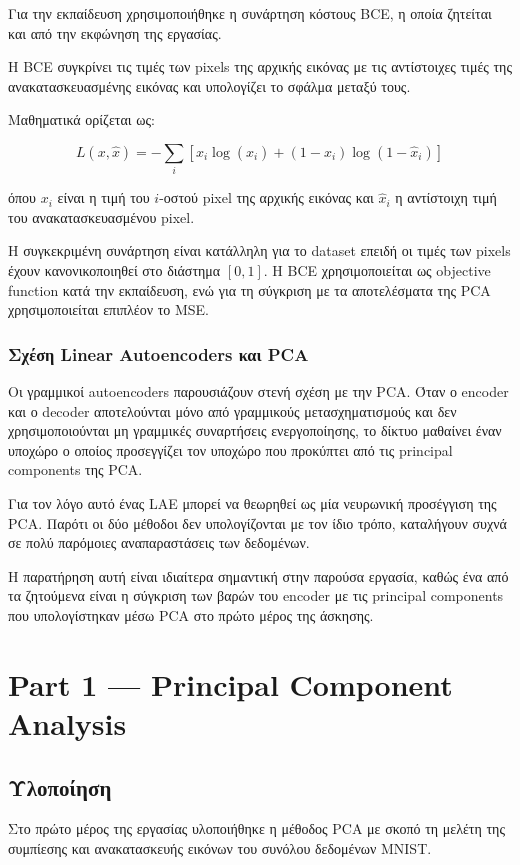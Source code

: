 \documentclass[12pt]{article}
\begin{document}
Για την εκπαίδευση χρησιμοποιήθηκε η συνάρτηση κόστους BCE, η οποία ζητείται και από την εκφώνηση της εργασίας.

Η BCE συγκρίνει τις τιμές των pixels της αρχικής εικόνας με τις αντίστοιχες τιμές της ανακατασκευασμένης εικόνας και υπολογίζει το σφάλμα μεταξύ τους.

Μαθηματικά ορίζεται ως:

\[
L(x,\hat{x})
=
-\sum_i
\left[
x_i \log(\hat{x}_i)
+
(1-x_i)\log(1-\hat{x}_i)
\right]
\]

όπου \(x_i\) είναι η τιμή του \(i\)-οστού pixel της αρχικής εικόνας και \(\hat{x}_i\) η αντίστοιχη τιμή του ανακατασκευασμένου pixel.

Η συγκεκριμένη συνάρτηση είναι κατάλληλη για το dataset επειδή οι τιμές των pixels έχουν κανονικοποιηθεί στο διάστημα \([0,1]\). Η BCE χρησιμοποιείται 
ως objective function κατά την εκπαίδευση, ενώ για τη σύγκριση με τα αποτελέσματα της PCA χρησιμοποιείται επιπλέον το MSE.


\subsubsection{Σχέση Linear Autoencoders και PCA}

Οι γραμμικοί autoencoders παρουσιάζουν στενή σχέση με την PCA. Όταν ο encoder και ο decoder αποτελούνται μόνο από γραμμικούς μετασχηματισμούς και δεν 
χρησιμοποιούνται μη γραμμικές συναρτήσεις ενεργοποίησης, το δίκτυο μαθαίνει έναν υποχώρο ο οποίος προσεγγίζει τον υποχώρο που προκύπτει από τις 
principal components της PCA.

Για τον λόγο αυτό ένας LAE μπορεί να θεωρηθεί ως μία νευρωνική προσέγγιση της PCA. Παρότι οι δύο μέθοδοι δεν υπολογίζονται με τον ίδιο τρόπο, καταλήγουν 
συχνά σε πολύ παρόμοιες αναπαραστάσεις των δεδομένων.

Η παρατήρηση αυτή είναι ιδιαίτερα σημαντική στην παρούσα εργασία, καθώς ένα από τα ζητούμενα είναι η σύγκριση των βαρών του encoder με τις 
principal components που υπολογίστηκαν μέσω PCA στο πρώτο μέρος της άσκησης.






\section{Part 1 — Principal Component Analysis}

\subsection{Υλοποίηση}
Στο πρώτο μέρος της εργασίας υλοποιήθηκε η μέθοδος PCA με σκοπό τη μελέτη της συμπίεσης και ανακατασκευής εικόνων του συνόλου δεδομένων MNIST.
\end{document}
